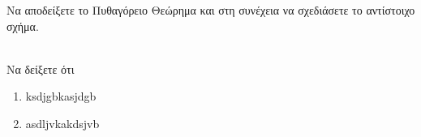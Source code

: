 \documentclass[a4paper,12pt]{examsgr}
\begin{document}
\schoolbasic
\thema 
Να αποδείξετε το Πυθαγόρειο Θεώρημα και στη συνέχεια να σχεδιάσετε το  αντίστοιχο σχήμα. 

\\

\thema
Να δείξετε ότι
\begin{enumerate}
\item ksdjgbkasjdgb 
\item asdljvkakdsjvb  
\end{enumerate}



\schoolfinish
\end{document}
